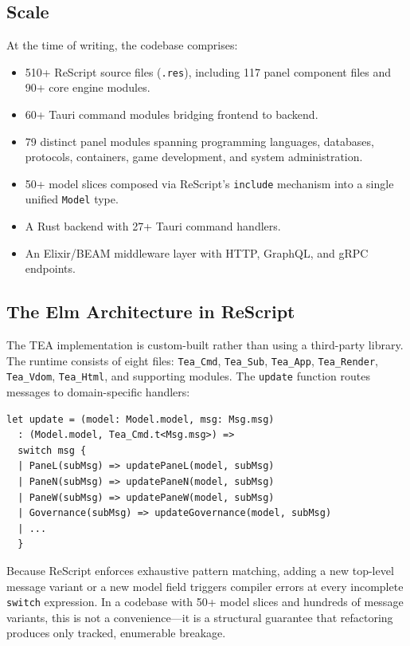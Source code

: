 \documentclass[11pt,a4paper]{article}
\newcommand{\tea}{\textsc{TEA}}
\begin{document}
\subsection{Scale}

At the time of writing, the codebase comprises:
\begin{itemize}
  \item 510+ ReScript source files (\texttt{.res}), including
    117 panel component files and 90+ core engine modules.
  \item 60+ Tauri command modules bridging frontend to backend.
  \item 79 distinct panel modules spanning programming languages,
    databases, protocols, containers, game development, and
    system administration.
  \item 50+ model slices composed via ReScript's \texttt{include}
    mechanism into a single unified \texttt{Model} type.
  \item A Rust backend with 27+ Tauri command handlers.
  \item An Elixir/BEAM middleware layer with HTTP, GraphQL, and
    gRPC endpoints.
\end{itemize}

\subsection{The Elm Architecture in ReScript}

The \tea{} implementation is custom-built rather than using a
third-party library. The runtime consists of eight files:
\texttt{Tea\_Cmd}, \texttt{Tea\_Sub}, \texttt{Tea\_App},
\texttt{Tea\_Render}, \texttt{Tea\_Vdom}, \texttt{Tea\_Html},
and supporting modules. The \texttt{update} function routes
messages to domain-specific handlers:

\begin{verbatim}
let update = (model: Model.model, msg: Msg.msg)
  : (Model.model, Tea_Cmd.t<Msg.msg>) =>
  switch msg {
  | PaneL(subMsg) => updatePaneL(model, subMsg)
  | PaneN(subMsg) => updatePaneN(model, subMsg)
  | PaneW(subMsg) => updatePaneW(model, subMsg)
  | Governance(subMsg) => updateGovernance(model, subMsg)
  | ...
  }
\end{verbatim}

Because ReScript enforces exhaustive pattern matching, adding a new
top-level message variant or a new model field triggers compiler
errors at every incomplete \texttt{switch} expression. In a codebase
with 50+ model slices and hundreds of message variants, this is not
a convenience---it is a structural guarantee that refactoring
produces only tracked, enumerable breakage.
\end{document}
